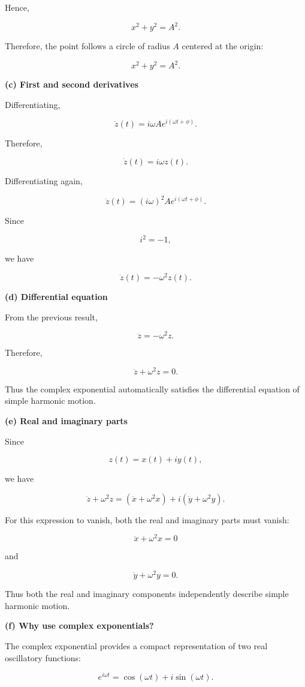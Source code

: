 \documentclass[../main.tex]{subfiles}
\theoremstyle{remark}
\begin{document}
Hence,

\[
x^2+y^2=A^2.
\]

Therefore, the point follows a circle of radius \(A\) centered at the origin:

\[
\boxed{
x^2+y^2=A^2.
}
\]

\textbf{(c) First and second derivatives}

Differentiating,

\[
\dot z(t)
=
i\omega A e^{i(\omega t+\phi)}.
\]

Therefore,

\[
\boxed{
\dot z(t)=i\omega z(t).
}
\]

Differentiating again,

\[
\ddot z(t)
=
(i\omega)^2 A e^{i(\omega t+\phi)}.
\]

Since

\[
i^2=-1,
\]

we have

\[
\boxed{
\ddot z(t)=-\omega^2 z(t).
}
\]

\textbf{(d) Differential equation}

From the previous result,

\[
\ddot z=-\omega^2z.
\]

Therefore,

\[
\boxed{
\ddot z+\omega^2z=0.
}
\]

Thus the complex exponential automatically satisfies the differential equation of simple harmonic motion.

\textbf{(e) Real and imaginary parts}

Since

\[
z(t)
=
x(t)+iy(t),
\]

we have

\[
\ddot z+\omega^2z
=
\left(\ddot x+\omega^2x\right)
+
i\left(\ddot y+\omega^2y\right).
\]

For this expression to vanish, both the real and imaginary parts must vanish:

\[
\boxed{
\ddot x+\omega^2x=0
}
\]

and

\[
\boxed{
\ddot y+\omega^2y=0.
}
\]

Thus both the real and imaginary components independently describe simple harmonic motion.

\textbf{(f) Why use complex exponentials?}

The complex exponential provides a compact representation of two real oscillatory functions:

\[
e^{i\omega t}
=
\cos(\omega t)+i\sin(\omega t).
\]
\end{document}
